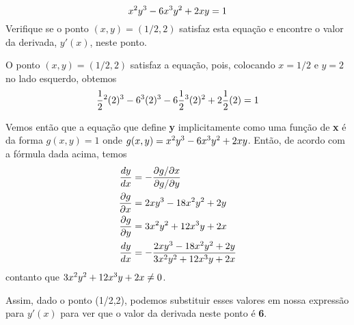 \documentclass[a4paper]{article}
\begin{document}
\begin{equation}
    x\textsuperscript{2}y\textsuperscript{3} - 6x\textsuperscript{3}y\textsuperscript{2} + 2xy = 1
\end{equation}
Verifique se o ponto $(x,y) = (1/2,2)$ satisfaz esta equação e encontre o valor da derivada, $y'(x)$, neste ponto.
\par O ponto $(x,y) = (1/2,2)$ satisfaz a equação, pois, colocando $x = 1/2$ e $y = 2$ no lado esquerdo, obtemos
\begin{equation}
    \frac{1}{2}\textsuperscript{2}(2)\textsuperscript{3} - 6\textsuperscript{3}(2)\textsuperscript{3} - 6\frac{1}{2}\textsuperscript{3}(2)\textsuperscript{2} + 2\frac{1}{2}(2) = 1
\end{equation}
\par Vemos então que a equação que define \textbf{y} implicitamente como uma função de \textbf{x} é da forma $g(x,y) = 1$ onde $g(x,y) = x\textsuperscript{2}y\textsuperscript{3} - 6x\textsuperscript{3}y\textsuperscript{2}+2xy$. Então, de acordo com a fórmula dada acima, temos
\begin{equation}
    \begin{split}
        \frac{dy}{dx} & = - \frac{\partial g/\partial x}{\partial g/\partial y} \\
        \frac{\partial g}{\partial x}& = 2xy\textsuperscript{3} - 18x\textsuperscript{2}y\textsuperscript{2} + 2y \\
        \frac{\partial g}{\partial y}& = 3x\textsuperscript{2}y\textsuperscript{2} + 12x\textsuperscript{3}y + 2x \\
        \frac{dy}{dx} & = - \frac{2xy\textsuperscript{3} - 18x\textsuperscript{2}y\textsuperscript{2} + 2y}{3x\textsuperscript{2}y\textsuperscript{2} + 12x\textsuperscript{3}y + 2x}
    \end{split}
\end{equation}
contanto que $3x\textsuperscript{2}y\textsuperscript{2} + 12x\textsuperscript{3}y + 2x \neq 0$.
\par Assim, dado o ponto (1/2,2), podemos substituir esses valores em nossa expressão para $y'(x)$ para ver que o valor da derivada neste ponto é \textbf{6}.
\end{document}
